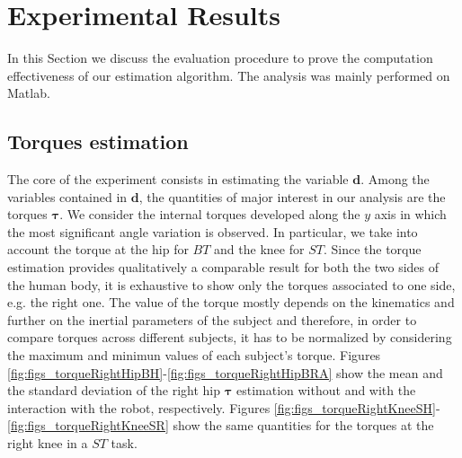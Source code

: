 
\section{Experimental Results}
%
In this Section we discuss the evaluation procedure to prove the computation effectiveness of
 our estimation algorithm. The analysis was mainly performed on Matlab. 
%
\subsection{Torques estimation}
The core of the experiment consists in estimating the
 variable $\bm d$.  Among the variables contained in $\bm d$, the quantities of major 
 interest in our analysis are 
 the torques $\bm{\tau}$. We consider the internal
 torques developed along the $y$ axis in which the most significant angle variation is observed. 
In particular, we take into account the torque at the hip for $BT$ and the knee for $ST$. Since
 the torque estimation provides qualitatively a comparable result for both the two sides of 
 the human body, it is exhaustive to show only the torques associated to one side, e.g. the
  right one.
The value of the torque mostly depends on the kinematics and further on the 
inertial parameters of the subject and therefore, in order to compare torques across different subjects,
 it has to be normalized by considering the maximum and minimun values of each 
 subject's torque. 
Figures \ref{fig:figs_torqueRightHipBH}-\ref{fig:figs_torqueRightHipBRA} show the mean 
and the standard deviation of the right hip $\bm{\tau}$ estimation  without and 
with the interaction with the robot, respectively.  Figures \ref{fig:figs_torqueRightKneeSH}-\ref{fig:figs_torqueRightKneeSR} show the same 
quantities for the torques at the right knee in a $ST$ task.
%
